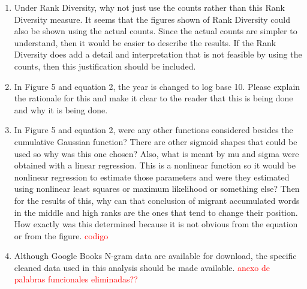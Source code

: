 \documentclass{article}
\begin{document}
\begin{enumerate}
		\item Under Rank Diversity, why not just use the counts rather than this
		Rank Diversity measure. It seems that the figures shown of Rank
		Diversity could also be shown using the actual counts. Since the
		actual counts are simpler to understand, then it would be easier to
		describe the results. If the Rank Diversity does add a detail and
		interpretation that is not feasible by using the counts, then this
		justification should be included.
		
		\item  In Figure 5 and equation 2, the year is changed to log base 10.
		Please explain the rationale for this and make it clear to the reader
		that this is being done and why it is being done.
		
		\item  In Figure 5 and equation 2, were any other functions considered
		besides the cumulative Gaussian function? There are other sigmoid
		shapes that could be used so why was this one chosen? Also, what is
		meant by mu and sigma were obtained with a linear regression. This is
		a nonlinear function so it would be nonlinear regression to estimate
		those parameters and were they estimated using nonlinear least squares
		or maximum likelihood or something else? Then for the results of this,
		why can that conclusion of migrant accumulated words in the middle and
		high ranks are the ones that tend to change their position. How
		exactly was this determined because it is not obvious from the
		equation or from the figure. \textcolor{red}{codigo}
		
		\item  Although Google Books N-gram data are available for download, the
		specific cleaned data used in this analysis should be made available. \textcolor{red}{anexo de palabras funcionales eliminadas??}
		
		
		
	\end{enumerate}
	
\end{document}
